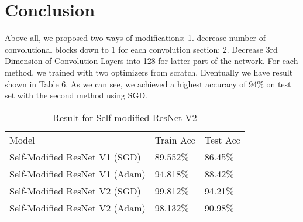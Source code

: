 \documentclass[letterpaper]{article} %
\begin{document}
\section{Conclusion}
Above all, we proposed two ways of modifications: 1. decrease number of convolutional blocks down to 1 for each convolution section; 2. Decrease 3rd Dimension of Convolution Layers into 128 for latter part of the network. For each method, we trained with two optimizers from scratch. Eventually we have result shown in Table 6. As we can see, we achieved a highest accuracy of 94\% on test set with the second method using SGD. 
\begin{table}[H]
	\centering
	\begin{tabular}{l|l|l}
    Model & Train Acc & Test Acc\\
    Self-Modified ResNet V1 (SGD) & 89.552\%  & 86.45\%  \\
    Self-Modified ResNet V1 (Adam) & 94.818\%  & 88.42\%  \\
    Self-Modified ResNet V2 (SGD) & 99.812\%  & 94.21\%  \\
    Self-Modified ResNet V2 (Adam) & 98.132\%  & 90.98\%  \\
	\end{tabular}
	\caption{Result for Self modified ResNet V2}
\end{table}

\end{document}
